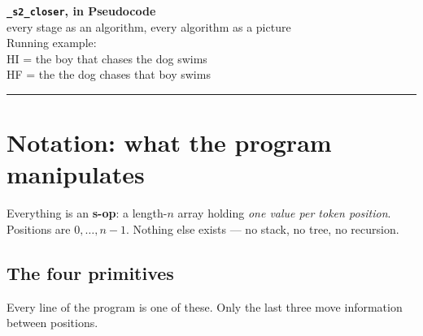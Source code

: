 \documentclass[11pt]{article}
\newcommand{\code}[1]{\texttt{#1}}
\newcommand{\cellrow}[4]{%
  \node[font=\scriptsize\ttfamily, text=invc, anchor=east] at (-0.55,#1) {#2};
  \foreach \v [count=\i from 0] in {#3}{
     \node[draw=black!45, fill=#4, minimum size=6.2mm, inner sep=0pt,
           font=\scriptsize] at (\i,#1) {\v};}}
\begin{document}
\begin{center}
  {\LARGE\bfseries \texttt{\_s2\_closer}, in Pseudocode}\\[3pt]
  {\large every stage as an algorithm, every algorithm as a picture}\\[5pt]
  {\small Running example:}\\[1pt]
  {\small\ttfamily HI = the boy that chases the dog swims}\\[1pt]
  {\small\ttfamily HF = the the dog chases that boy swims}
\end{center}
\vspace{4pt}\hrule\vspace{6pt}

\section{Notation: what the program manipulates}

Everything is an \textbf{s-op}: a length-$n$ array holding \emph{one value per token position}.
Positions are $0,\dots,n-1$. Nothing else exists --- no stack, no tree, no recursion.

\begin{center}
\end{center}

\subsection{The four primitives}
Every line of the program is one of these. Only the last three move information between positions.
\end{document}
